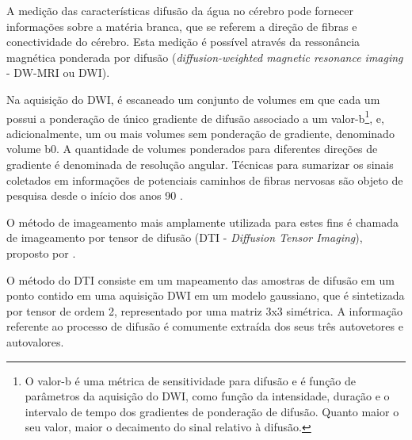 \documentclass[
    12pt,                %
    oneside,            %
    a4paper,            %
    english,            %
    french,                %
    spanish,            %
    brazil                %
    ]{abntex2}
\begin{document}
A medição das características difusão da água no cérebro pode fornecer informações sobre a matéria branca, que se referem a direção de fibras e conectividade do cérebro. Esta medição é possível através da ressonância magnética ponderada por difusão (\textit{diffusion-weighted magnetic resonance imaging} - DW-MRI ou DWI).





Na aquisição do DWI, é escaneado um conjunto de volumes em que cada um possui a ponderação de único gradiente de difusão associado a um valor-b\footnote{O valor-b é uma métrica de sensitividade para difusão e é função de parâmetros da aquisição do DWI, como função da intensidade, duração e o intervalo de tempo dos gradientes de ponderação de difusão. Quanto maior o seu valor, maior o decaimento do sinal relativo à difusão.}, e, adicionalmente, um ou mais volumes sem ponderação de gradiente, denominado volume b0. A quantidade de volumes ponderados para diferentes direções de gradiente é denominada de resolução angular. Técnicas para sumarizar os sinais coletados em informações de potenciais caminhos de fibras nervosas são objeto de pesquisa desde o início dos anos 90 \cite{descoteaux2015}.%

O método de imageamento mais amplamente utilizada para estes fins é chamada de imageamento por tensor de difusão (DTI - \textit{Diffusion Tensor Imaging}), proposto por . 

O método do DTI consiste em um mapeamento das amostras de difusão em um ponto contido em uma aquisição DWI em um modelo gaussiano, que é sintetizada por tensor de ordem 2, representado por uma matriz 3x3 simétrica. A informação referente ao processo de difusão é comumente extraída dos seus três autovetores e autovalores.%
\end{document}
